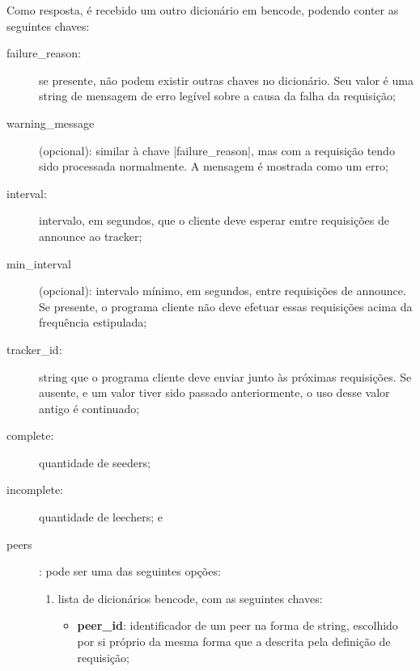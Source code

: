 
Como resposta, é recebido um outro dicionário em \gls*{bencode}, podendo conter as
seguintes chaves:

\begin{description}
    \item[failure\_reason:] se presente, não podem existir outras chaves no dicionário.
        Seu valor é uma \gls*{string} de mensagem de erro legível sobre a causa da falha
        da requisição;

    \item[warning\_message] (opcional): similar à chave \bverb|failure_reason|, mas com
        a requisição tendo sido processada normalmente. A mensagem é mostrada como um
        erro;

    \item[interval:] intervalo, em segundos, que o cliente deve esperar emtre
        requisições de \gls*{announce} ao \gls*{tracker};

    \item[min\_interval] (opcional): intervalo mínimo, em segundos, entre requisições
        de \gls*{announce}. Se presente, o programa cliente não deve efetuar essas
        requisições acima da frequência estipulada;

    \item[tracker\_id:] \gls*{string} que o programa cliente deve enviar junto às
        próximas requisições. Se ausente, e um valor tiver sido passado anteriormente, o
        uso desse valor antigo é continuado;

    \item[complete:] quantidade de \glspl*{seeder};

    \item[incomplete:] quantidade de \glspl*{leecher}; e

    \item[\glspl*{peer}]: pode ser uma das seguintes opções:

        \begin{enumerate}
            \item lista de dicionários \gls*{bencode}, com as seguintes chaves:

            \begin{itemize}
                \item \textbf{peer\_id}: identificador de um \gls*{peer} na forma de
                    \gls*{string}, escolhido por si próprio da mesma forma que a
                    descrita pela definição de requisição;


\end{itemize}
\end{enumerate}
\end{description}
